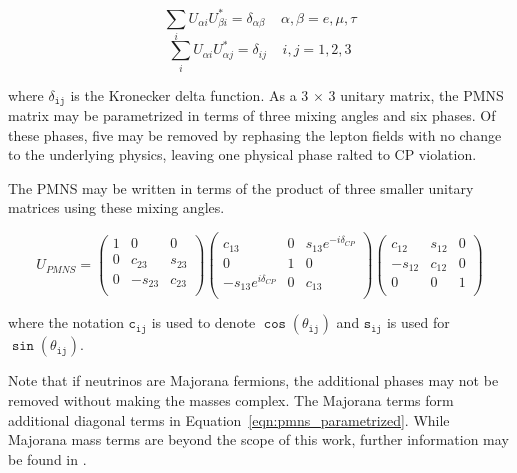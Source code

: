 \begin{equation}
\sum_i U_{\alpha i} U_{\beta i}^* = \delta_{\alpha \beta} \;\;\;\; \alpha,\beta=e, \mu, \tau
\label{eqn:unitarity_condition_flavor}
\end{equation}
\begin{equation}
\sum_i U_{\alpha i} U_{\alpha j}^* = \delta_{ij} \;\;\;\; i,j=1,2,3
\label{eqn:unitarity_condition_mass}
\end{equation}

where $\mathtt{\delta_{ij}}$ is the Kronecker delta function.
As a 3 $\mathtt{\times}$ 3 unitary matrix, the PMNS matrix may be parametrized in terms of three mixing angles and six phases.
Of these phases, five may be removed by rephasing the lepton fields with no change to the underlying physics, leaving one physical phase ralted to CP violation.

The PMNS may be written in terms of the product of three smaller unitary matrices using these mixing angles.

\begin{equation}
U_{PMNS} = 
\begin{pmatrix}
1 & 0 & 0 \\
0 & c_{23} & s_{23} \\
0 & -s_{23} & c_{23} \\
\end{pmatrix}
\begin{pmatrix}
c_{13} & 0 & s_{13} e^{-i\delta_{CP}} \\
0 & 1 & 0 \\
-s_{13} e^{i \delta_{CP}} & 0 & c_{13} \\
\end{pmatrix}
\begin{pmatrix}
c_{12} & s_{12} & 0 \\
-s_{12} & c_{12} & 0 \\
0 & 0 & 1 \\
\end{pmatrix}
\label{eqn:pmns_parametrized}
\end{equation}

where the notation $\mathtt{c_{ij}}$ is used to denote $\mathtt{\cos\left(\theta_{ij}\right)}$ and $\mathtt{s_{ij}}$ is used for $\mathtt{\sin\left(\theta_{ij}\right)}$.

Note that if neutrinos are Majorana fermions, the additional phases may not be removed without making the masses complex.
The Majorana terms form additional diagonal terms in Equation~\ref{eqn:pmns_parametrized}.
While Majorana mass terms are beyond the scope of this work, further information may be found in \cite{Review-PMNS,Review-MajoranaNu}.

